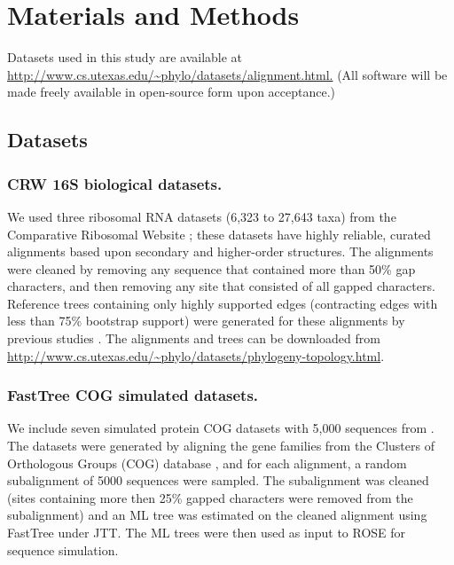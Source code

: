 

\makeatletter 
\renewcommand{\thefigure}{B\@arabic\c@figure} 
\makeatletter 
\renewcommand{\thetable}{B\@arabic\c@table} 
\makeatletter 
\renewcommand{\thesection}{B\@arabic\c@section} 

\section{Materials and Methods}
Datasets used in this study are available at
\url{http://www.cs.utexas.edu/~phylo/datasets/alignment.html.}
(All software will be made freely available in open-source form upon acceptance.) 
\subsection{Datasets }\label{datasets}

\subsubsection{CRW 16S biological datasets.}  
We used three ribosomal RNA datasets (6,323 to 27,643 taxa) from the
Comparative Ribosomal Website \cite{Cannone2002}; 
these datasets have highly reliable, curated alignments based upon secondary 
and higher-order structures.  The alignments were cleaned by removing any sequence that contained more than 50\% gap characters, and then removing any site that consisted of all gapped characters. 
 Reference trees containing only highly supported edges (contracting edges with less than 75\% bootstrap support) 
were generated for these alignments by previous studies \cite{Liu2009,Liu2012}.  The alignments and trees can be downloaded from \url{http://www.cs.utexas.edu/~phylo/datasets/phylogeny-topology.html}.

\subsubsection{FastTree COG simulated datasets.}  
We include seven simulated protein COG datasets with 5,000 sequences from \cite{Price2010}.  
The datasets were generated by aligning the gene families from the
Clusters of Orthologous Groups (COG) database \cite{Tatusov01012001}, and for each alignment, a random subalignment of 5000 sequences were sampled.  The subalignment was cleaned (sites containing more then 25\% gapped characters were removed from the subalignment) and an ML tree was estimated on the cleaned alignment using FastTree under JTT.  The ML trees were then used as input to ROSE \cite{Stoye1998} for sequence simulation.

